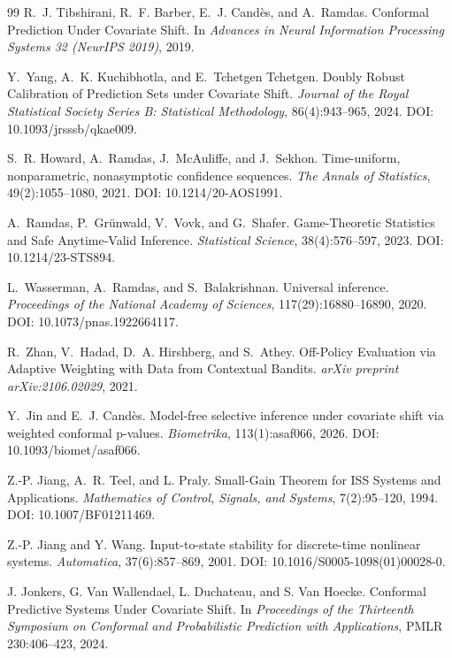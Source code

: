 \documentclass[11pt]{article}
\theoremstyle{definition}
\newcommand{\1}{\mathbf{1}}
\begin{document}
\begin{thebibliography}{99}
R.~J. Tibshirani, R.~F. Barber, E.~J. Cand\`es, and A.~Ramdas.
\newblock Conformal Prediction Under Covariate Shift.
\newblock In \emph{Advances in Neural Information Processing Systems 32 (NeurIPS 2019)}, 2019.

Y.~Yang, A.~K. Kuchibhotla, and E.~Tchetgen Tchetgen.
\newblock Doubly Robust Calibration of Prediction Sets under Covariate Shift.
\newblock \emph{Journal of the Royal Statistical Society Series B: Statistical Methodology}, 86(4):943--965, 2024. DOI: 10.1093/jrsssb/qkae009.

S.~R. Howard, A.~Ramdas, J.~McAuliffe, and J.~Sekhon.
\newblock Time-uniform, nonparametric, nonasymptotic confidence sequences.
\newblock \emph{The Annals of Statistics}, 49(2):1055--1080, 2021. DOI: 10.1214/20-AOS1991.

A.~Ramdas, P.~Gr\"unwald, V.~Vovk, and G.~Shafer.
\newblock Game-Theoretic Statistics and Safe Anytime-Valid Inference.
\newblock \emph{Statistical Science}, 38(4):576--597, 2023. DOI: 10.1214/23-STS894.

L.~Wasserman, A.~Ramdas, and S.~Balakrishnan.
\newblock Universal inference.
\newblock \emph{Proceedings of the National Academy of Sciences}, 117(29):16880--16890, 2020. DOI: 10.1073/pnas.1922664117.

R.~Zhan, V.~Hadad, D.~A. Hirshberg, and S.~Athey.
\newblock Off-Policy Evaluation via Adaptive Weighting with Data from Contextual Bandits.
\newblock \emph{arXiv preprint arXiv:2106.02029}, 2021.

Y.~Jin and E.~J. Cand\`es.
\newblock Model-free selective inference under covariate shift via weighted conformal p-values.
\newblock \emph{Biometrika}, 113(1):asaf066, 2026. DOI: 10.1093/biomet/asaf066.


Z.-P. Jiang, A.~R. Teel, and L. Praly.
\newblock Small-Gain Theorem for ISS Systems and Applications.
\newblock \emph{Mathematics of Control, Signals, and Systems}, 7(2):95--120, 1994. DOI: 10.1007/BF01211469.

Z.-P. Jiang and Y. Wang.
\newblock Input-to-state stability for discrete-time nonlinear systems.
\newblock \emph{Automatica}, 37(6):857--869, 2001. DOI: 10.1016/S0005-1098(01)00028-0.

J. Jonkers, G. Van Wallendael, L. Duchateau, and S. Van Hoecke.
\newblock Conformal Predictive Systems Under Covariate Shift.
\newblock In \emph{Proceedings of the Thirteenth Symposium on Conformal and Probabilistic Prediction with Applications}, PMLR 230:406--423, 2024.



\end{thebibliography}
\end{document}
